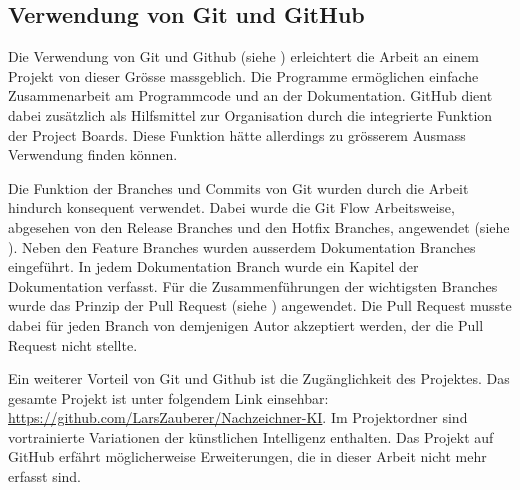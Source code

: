  
\subsection{Verwendung von Git und GitHub}\label{sub:d_reflex_git} Die
Verwendung von Git und Github (siehe ) erleichtert die
Arbeit an einem Projekt von dieser Grösse massgeblich. Die Programme ermöglichen
einfache Zusammenarbeit am Programmcode und an der Dokumentation. GitHub dient
dabei zusätzlich als Hilfsmittel zur Organisation durch die integrierte Funktion
der Project Boards. Diese Funktion hätte allerdings zu grösserem Ausmass
Verwendung finden können.
 
Die Funktion der Branches und Commits von Git wurden durch die Arbeit hindurch
konsequent verwendet. Dabei wurde die Git Flow Arbeitsweise, abgesehen von den
Release Branches und den Hotfix Branches, angewendet (siehe
). Neben den Feature Branches wurden ausserdem
Dokumentation Branches eingeführt. In jedem Dokumentation Branch wurde ein
Kapitel der Dokumentation verfasst. Für die Zusammenführungen der wichtigsten
Branches wurde das Prinzip der Pull Request (siehe )
angewendet. Die Pull Request musste dabei für jeden Branch von demjenigen Autor
akzeptiert werden, der die Pull Request nicht stellte.

\newpage
Ein weiterer Vorteil von Git und Github ist die Zugänglichkeit des Projektes.
Das gesamte Projekt ist unter folgendem Link einsehbar:
\url{https://github.com/LarsZauberer/Nachzeichner-KI}. Im Projektordner sind
vortrainierte Variationen der künstlichen Intelligenz enthalten. Das Projekt auf
GitHub erfährt möglicherweise Erweiterungen, die in dieser Arbeit nicht mehr
erfasst sind.
